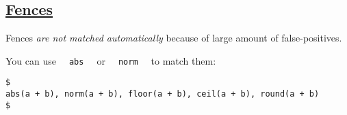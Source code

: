 \subsection{\texorpdfstring{\hyperref[fences]{Fences}}{Fences}}\label{fences}

Fences \emph{are not matched automatically} because of large amount of
false-positives.

You can use \texttt{\ }{\texttt{\ abs\ }}\texttt{\ } or
\texttt{\ }{\texttt{\ norm\ }}\texttt{\ } to match them:

\begin{verbatim}
$
abs(a + b), norm(a + b), floor(a + b), ceil(a + b), round(a + b)
$
\end{verbatim}

\pandocbounded{}
